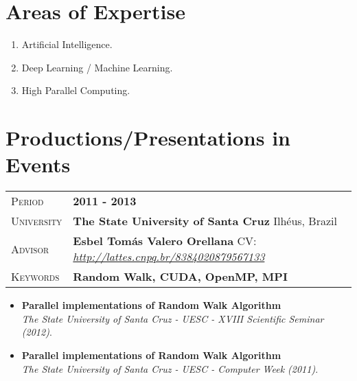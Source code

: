 \documentclass[10pt, a4paper, oneside, final]{scrartcl} %
\newcommand{\gray}{\rowcolor[gray]{.90}} %
\begin{document}
\section{Areas of Expertise}

\begin{enumerate}\itemsep1.5pt
\item Artificial Intelligence.
\item Deep Learning / Machine Learning.
\item High Parallel Computing.
\end{enumerate}


\section{Productions/Presentations in Events}

\begin{center}
\begin{tabularx}{1.0\linewidth}{>{\raggedleft\scshape}p{2.34cm}X}
\gray Period & \textbf{2011 - 2013}\\
\gray University & \textbf{The State University of Santa Cruz} \hfill Ilhéus, Brazil\\
\gray Advisor & \textbf{Esbel Tomás Valero Orellana} \hfill CV: \hyperref[Esbel Valero]{\textit{http://lattes.cnpq.br/8384020879567133}}\\
\gray Keywords & \textbf{Random Walk, CUDA, OpenMP, MPI}
\end{tabularx}
\end{center}

\begin{itemize}\itemsep1.5pt
\item \textbf{Parallel implementations of Random Walk Algorithm} \\ 
      \textit{The State University of Santa Cruz - UESC - XVIII Scientific Seminar (2012)}.
      
\item \textbf{Parallel implementations of Random Walk Algorithm} \\ 
      \textit{The State University of Santa Cruz - UESC - Computer Week (2011)}.
\end{itemize}

\end{document}
